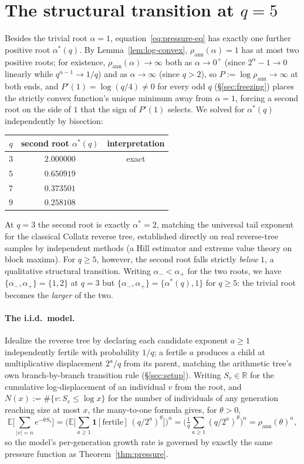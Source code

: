 \documentclass[11pt]{article}
\theoremstyle{remark}
\begin{document}
\section{The structural transition at $q=5$}
\label{sec:transition}

Besides the trivial root $\alpha=1$, equation~\eqref{eq:pressure-eq}
has exactly one further positive root $\alpha^\ast(q)$. By
Lemma~\ref{lem:log-convex}, $\rho_{\mathrm{ann}}(\alpha)=1$ has at
most two positive roots; for existence, $\rho_{\mathrm{ann}}(\alpha)\to
\infty$ both as $\alpha\to0^+$ (since $2^\alpha-1\to0$ linearly while
$q^{\alpha-1}\to1/q$) and as $\alpha\to\infty$ (since $q>2$), so
$P:=\log\rho_{\mathrm{ann}}\to\infty$ at both ends, and
$P'(1)=\log(q/4)\ne0$ for every odd $q$ (\S\ref{sec:freezing}) places
the strictly convex function's unique minimum away from $\alpha=1$,
forcing a second root on the side of $1$ that the sign of $P'(1)$
selects. We solved for $\alpha^\ast(q)$ independently by bisection:

\begin{center}
\begin{tabular}{c|c|c}
$q$ & second root $\alpha^\ast(q)$ & interpretation \\ \hline
$3$ & $2.000000$ & exact \\
$5$ & $0.650919$ & \\
$7$ & $0.373501$ & \\
$9$ & $0.258108$ &
\end{tabular}
\end{center}

At $q=3$ the second root is exactly $\alpha^\ast=2$, matching the
universal tail exponent for the classical Collatz reverse tree,
established directly on real reverse-tree samples by independent
methods (a Hill estimator and extreme value theory on block maxima).
For $q\ge 5$, however, the second root falls
strictly \emph{below} $1$, a qualitative structural transition. Writing
$\alpha_-<\alpha_+$ for
the two roots, we have $\{\alpha_-,\alpha_+\}=\{1,2\}$ at $q=3$ but
$\{\alpha_-,\alpha_+\}=\{\alpha^\ast(q),1\}$ for $q\ge5$: the trivial
root becomes the \emph{larger} of the two.

\paragraph{The i.i.d.\ model.} Idealize the reverse tree by declaring
each candidate exponent $a\ge1$ independently fertile with probability
$1/q$; a fertile $a$ produces a child at multiplicative displacement
$2^a/q$ from its parent, matching the arithmetic tree's own
branch-by-branch transition rule (\S\ref{sec:setup}). Writing
$S_v\in\mathbb{R}$ for the cumulative log-displacement
of an individual $v$ from the root, and $N(x):=\#\{v:S_v\le\log x\}$ for
the number of individuals of any generation reaching size at most $x$,
the many-to-one formula gives, for $\theta>0$,
\[
\mathbb E\Big[\sum_{|v|=n}e^{-\theta S_v}\Big]
=\Big(\mathbb E\Big[\sum_{a\ge1}\mathbf1[\text{fertile}]\,(q/2^a)^{\theta}\Big]\Big)^{n}
=\Big(\tfrac1q\sum_{a\ge1}(q/2^a)^\theta\Big)^{n}
=\rho_{\mathrm{ann}}(\theta)^n,
\]
so the model's per-generation growth rate is governed by exactly the
same pressure function as Theorem~\ref{thm:pressure}.
\end{document}
